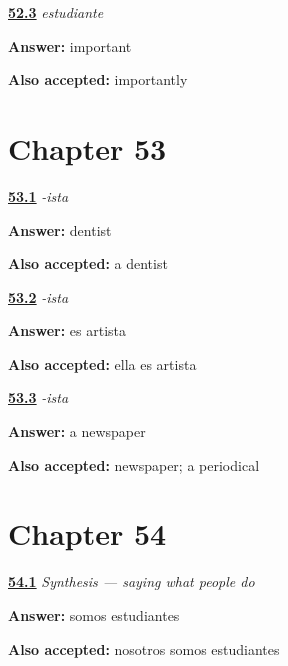 \noindent\begin{minipage}[t]{\linewidth}
\raggedright
\hyperlink{review-ES-C09-estudiante-decode}{\textbf{52.3}} \emph{estudiante}\par
\small \textbf{Answer:} important\par
\footnotesize \textbf{Also accepted:} importantly
\end{minipage}\par\medskip

\section*{Chapter 53}

\noindent\begin{minipage}[t]{\linewidth}
\raggedright
\hyperlink{review-ES-C09-ista-decode}{\textbf{53.1}} \emph{-ista}\par
\small \textbf{Answer:} dentist\par
\footnotesize \textbf{Also accepted:} a dentist
\end{minipage}\par\medskip

\noindent\begin{minipage}[t]{\linewidth}
\raggedright
\hyperlink{review-ES-C09-ista-say}{\textbf{53.2}} \emph{-ista}\par
\small \textbf{Answer:} es artista\par
\footnotesize \textbf{Also accepted:} ella es artista
\end{minipage}\par\medskip

\noindent\begin{minipage}[t]{\linewidth}
\raggedright
\hyperlink{review-ES-C09-ista-root}{\textbf{53.3}} \emph{-ista}\par
\small \textbf{Answer:} a newspaper\par
\footnotesize \textbf{Also accepted:} newspaper; a periodical
\end{minipage}\par\medskip

\section*{Chapter 54}

\noindent\begin{minipage}[t]{\linewidth}
\raggedright
\hyperlink{review-ES-C09-sintesis-trabajo-we}{\textbf{54.1}} \emph{Synthesis — saying what people do}\par
\small \textbf{Answer:} somos estudiantes\par
\footnotesize \textbf{Also accepted:} nosotros somos estudiantes
\end{minipage}\par\medskip

